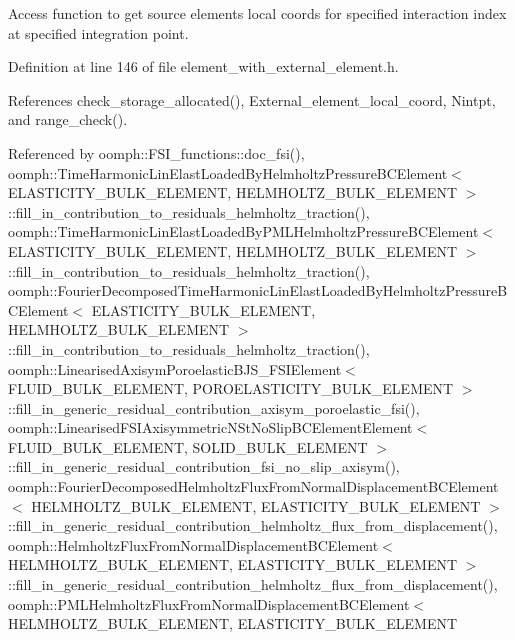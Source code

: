 Access function to get source element\textquotesingle{}s local coords for specified interaction index at specified integration point. 



Definition at line 146 of file element\+\_\+with\+\_\+external\+\_\+element.\+h.



References check\+\_\+storage\+\_\+allocated(), External\+\_\+element\+\_\+local\+\_\+coord, Nintpt, and range\+\_\+check().



Referenced by oomph\+::\+F\+S\+I\+\_\+functions\+::doc\+\_\+fsi(), oomph\+::\+Time\+Harmonic\+Lin\+Elast\+Loaded\+By\+Helmholtz\+Pressure\+B\+C\+Element$<$ E\+L\+A\+S\+T\+I\+C\+I\+T\+Y\+\_\+\+B\+U\+L\+K\+\_\+\+E\+L\+E\+M\+E\+N\+T, H\+E\+L\+M\+H\+O\+L\+T\+Z\+\_\+\+B\+U\+L\+K\+\_\+\+E\+L\+E\+M\+E\+N\+T $>$\+::fill\+\_\+in\+\_\+contribution\+\_\+to\+\_\+residuals\+\_\+helmholtz\+\_\+traction(), oomph\+::\+Time\+Harmonic\+Lin\+Elast\+Loaded\+By\+P\+M\+L\+Helmholtz\+Pressure\+B\+C\+Element$<$ E\+L\+A\+S\+T\+I\+C\+I\+T\+Y\+\_\+\+B\+U\+L\+K\+\_\+\+E\+L\+E\+M\+E\+N\+T, H\+E\+L\+M\+H\+O\+L\+T\+Z\+\_\+\+B\+U\+L\+K\+\_\+\+E\+L\+E\+M\+E\+N\+T $>$\+::fill\+\_\+in\+\_\+contribution\+\_\+to\+\_\+residuals\+\_\+helmholtz\+\_\+traction(), oomph\+::\+Fourier\+Decomposed\+Time\+Harmonic\+Lin\+Elast\+Loaded\+By\+Helmholtz\+Pressure\+B\+C\+Element$<$ E\+L\+A\+S\+T\+I\+C\+I\+T\+Y\+\_\+\+B\+U\+L\+K\+\_\+\+E\+L\+E\+M\+E\+N\+T, H\+E\+L\+M\+H\+O\+L\+T\+Z\+\_\+\+B\+U\+L\+K\+\_\+\+E\+L\+E\+M\+E\+N\+T $>$\+::fill\+\_\+in\+\_\+contribution\+\_\+to\+\_\+residuals\+\_\+helmholtz\+\_\+traction(), oomph\+::\+Linearised\+Axisym\+Poroelastic\+B\+J\+S\+\_\+\+F\+S\+I\+Element$<$ F\+L\+U\+I\+D\+\_\+\+B\+U\+L\+K\+\_\+\+E\+L\+E\+M\+E\+N\+T, P\+O\+R\+O\+E\+L\+A\+S\+T\+I\+C\+I\+T\+Y\+\_\+\+B\+U\+L\+K\+\_\+\+E\+L\+E\+M\+E\+N\+T $>$\+::fill\+\_\+in\+\_\+generic\+\_\+residual\+\_\+contribution\+\_\+axisym\+\_\+poroelastic\+\_\+fsi(), oomph\+::\+Linearised\+F\+S\+I\+Axisymmetric\+N\+St\+No\+Slip\+B\+C\+Element\+Element$<$ F\+L\+U\+I\+D\+\_\+\+B\+U\+L\+K\+\_\+\+E\+L\+E\+M\+E\+N\+T, S\+O\+L\+I\+D\+\_\+\+B\+U\+L\+K\+\_\+\+E\+L\+E\+M\+E\+N\+T $>$\+::fill\+\_\+in\+\_\+generic\+\_\+residual\+\_\+contribution\+\_\+fsi\+\_\+no\+\_\+slip\+\_\+axisym(), oomph\+::\+Fourier\+Decomposed\+Helmholtz\+Flux\+From\+Normal\+Displacement\+B\+C\+Element$<$ H\+E\+L\+M\+H\+O\+L\+T\+Z\+\_\+\+B\+U\+L\+K\+\_\+\+E\+L\+E\+M\+E\+N\+T, E\+L\+A\+S\+T\+I\+C\+I\+T\+Y\+\_\+\+B\+U\+L\+K\+\_\+\+E\+L\+E\+M\+E\+N\+T $>$\+::fill\+\_\+in\+\_\+generic\+\_\+residual\+\_\+contribution\+\_\+helmholtz\+\_\+flux\+\_\+from\+\_\+displacement(), oomph\+::\+Helmholtz\+Flux\+From\+Normal\+Displacement\+B\+C\+Element$<$ H\+E\+L\+M\+H\+O\+L\+T\+Z\+\_\+\+B\+U\+L\+K\+\_\+\+E\+L\+E\+M\+E\+N\+T, E\+L\+A\+S\+T\+I\+C\+I\+T\+Y\+\_\+\+B\+U\+L\+K\+\_\+\+E\+L\+E\+M\+E\+N\+T $>$\+::fill\+\_\+in\+\_\+generic\+\_\+residual\+\_\+contribution\+\_\+helmholtz\+\_\+flux\+\_\+from\+\_\+displacement(), oomph\+::\+P\+M\+L\+Helmholtz\+Flux\+From\+Normal\+Displacement\+B\+C\+Element$<$ H\+E\+L\+M\+H\+O\+L\+T\+Z\+\_\+\+B\+U\+L\+K\+\_\+\+E\+L\+E\+M\+E\+N\+T, E\+L\+A\+S\+T\+I\+C\+I\+T\+Y\+\_\+\+B\+U\+L\+K\+\_\+\+E\+L\+E\+M\+E\+N\+T 